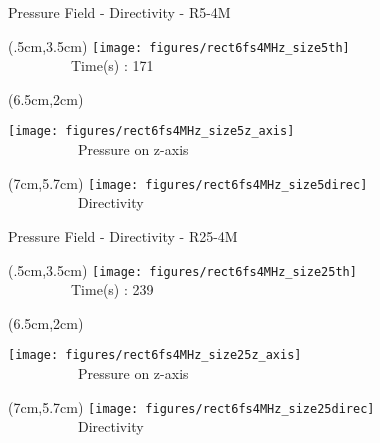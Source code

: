 \documentclass{beamer}
\begin{document}
\begin{frame}{Pressure Field - Directivity - R5-4M}
\begin{textblock*}{5cm}(.5cm,3.5cm) %
\texttt{[image: figures/rect6fs4MHz\_size5th]}
\newline \ \ \\ \ \ \ \ \ \ \ \ \ {\scriptsize Time(s) : 171}
\end{textblock*}
\begin{textblock*}{5cm}(6.5cm,2cm) %

	\texttt{[image: figures/rect6fs4MHz\_size5z\_axis]}
	\\\ \ \ \ \ \ \ \ \ \ {\scriptsize Pressure on z-axis}
\end{textblock*}
\begin{textblock*}{5cm}(7cm,5.7cm) %
	\texttt{[image: figures/rect6fs4MHz\_size5direc]}
		\\\ \ \ \ \ \ \ \ \ \ {\scriptsize Directivity}
\end{textblock*}
\end{frame}

\begin{frame}{Pressure Field - Directivity - R25-4M}
\begin{textblock*}{5cm}(.5cm,3.5cm) %
\texttt{[image: figures/rect6fs4MHz\_size25th]}
\newline \ \ \\ \ \ \ \ \ \ \ \ \ {\scriptsize Time(s) : 239}
\end{textblock*}
\begin{textblock*}{5cm}(6.5cm,2cm) %

	\texttt{[image: figures/rect6fs4MHz\_size25z\_axis]}
	\\\ \ \ \ \ \ \ \ \ \ {\scriptsize Pressure on z-axis}
\end{textblock*}
\begin{textblock*}{5cm}(7cm,5.7cm) %
	\texttt{[image: figures/rect6fs4MHz\_size25direc]}
		\\\ \ \ \ \ \ \ \ \ \ {\scriptsize Directivity}
\end{textblock*}
\end{frame}
\end{document}
